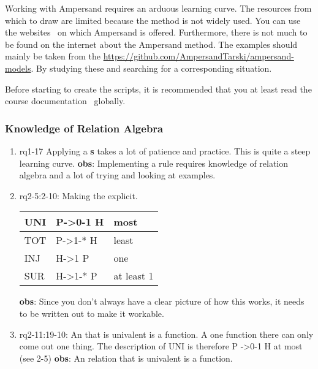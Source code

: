 Working with Ampersand requires an arduous learning curve.
The resources from which to draw are limited because the method is not widely used.
You can use the websites~\footnotemark{} on which Ampersand is offered.
Furthermore, there is not much to be found on the internet about the Ampersand method.
The examples should mainly be taken from the \url{https://github.com/AmpersandTarski/ampersand-models}.
By studying these and searching for a corresponding situation.

Before starting to create the scripts, it is recommended that you at least read the course documentation~ globally.



\subsubsection{Knowledge of Relation Algebra}
\begin{comment}
plaats hier de afgehandelde items.
\end{comment}
\begin{enumerate}
    \item rq1-17 Applying a \textbf{s} takes a lot of patience and practice.
    This is quite a steep learning curve.
    \newline\textbf{obs}: Implementing a rule requires knowledge of relation algebra and a lot of trying and looking at examples.
     
    \item rq2-5:2-10: Making the  explicit.\newline
    \begin{tabular}{ || l | l | l ||}
    \hline
    UNI & P->0-1 H &  most\\  \hline    
    TOT & P->1-* H  & least\\  \hline
    INJ & H->1 P  &   one\\  \hline
    SUR & H->1-* P &  at least 1\\ \hline
    \end{tabular}
    \newline\textbf{obs}: Since you don't always have a clear picture of how this works, it needs to be written out to make it workable.
    
    \item rq2-11:19-10: An  that is univalent is a function.
    A one function there can only come out one thing.
    The description of UNI is therefore P ->0-1 H at most (see 2-5)
    \newline\textbf{obs}: An relation that is univalent is a function.
     
\end{enumerate}

